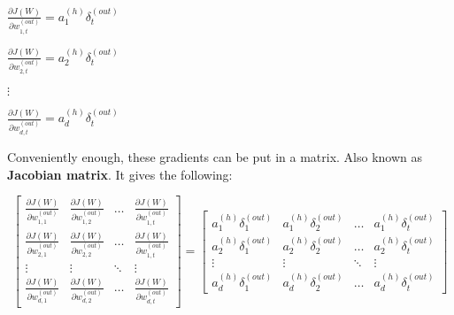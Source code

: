 \documentclass[../main.tex]{subfiles}
\begin{document}
\begin{multicols}{3}
    $\frac{\partial J(W)}{\partial w_{1,t}^{(out)}} = a_1^{(h)} \delta_t^{(out)}$

    \vspace{5mm} %

    $\frac{\partial J(W)}{\partial w_{2,t}^{(out)}} = a_2^{(h)} \delta_t^{(out)}$

    \vspace{5mm} %

    $\vdots$

    \vspace{5mm} %

    $\frac{\partial J(W)}{\partial w_{d,t}^{(out)}} = a_d^{(h)} \delta_t^{(out)}$
\end{multicols}

\vspace{5mm} %

Conveniently enough, these gradients can be put in a matrix. Also known as \textbf{Jacobian matrix}.
It gives the following:

\[
    \begin{bmatrix}
        \frac{\partial J(W)}{\partial w_{1,1}^{(out)}} & \frac{\partial J(W)}{\partial w_{1,2}^{(out)}} & \dots & \frac{\partial J(W)}{\partial w_{1,t}^{(out)}} \\
        \frac{\partial J(W)}{\partial w_{2,1}^{(out)}} & \frac{\partial J(W)}{\partial w_{2,2}^{(out)}} & \dots & \frac{\partial J(W)}{\partial w_{1,t}^{(out)}} \\
        \vdots                                         & \vdots                                         & \ddots & \vdots \\
        \frac{\partial J(W)}{\partial w_{d,1}^{(out)}} & \frac{\partial J(W)}{\partial w_{d,2}^{(out)}} & \dots & \frac{\partial J(W)}{\partial w_{d,t}^{(out)}}
    \end{bmatrix}
    =
    \begin{bmatrix}
        a_1^{(h)} \delta_1^{(out)}  & a_1^{(h)} \delta_2^{(out)}    & \dots  & a_1^{(h)} \delta_t^{(out)}   \\
        a_2^{(h)} \delta_1^{(out)}  & a_2^{(h)} \delta_2^{(out)}    & \dots  & a_2^{(h)} \delta_t^{(out)}   \\
        \vdots                      & \vdots                        & \ddots & \vdots                       \\
        a_d^{(h)} \delta_1^{(out)}  & a_d^{(h)} \delta_2^{(out)}    & \dots  & a_d^{(h)} \delta_t^{(out)}
    \end{bmatrix}
\]
\end{document}
